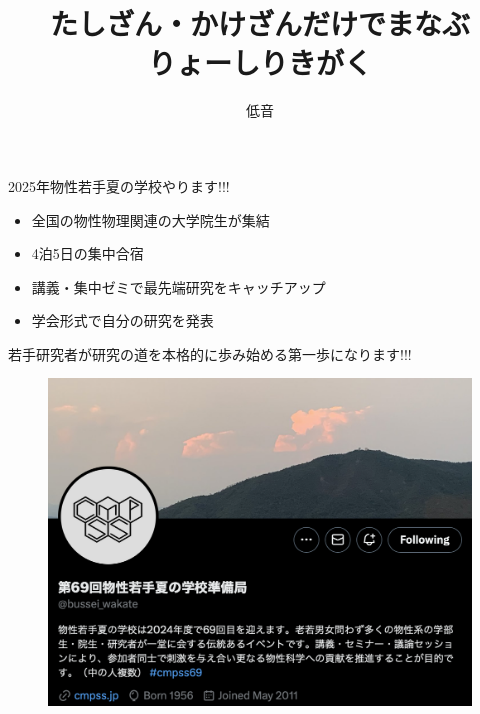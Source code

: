 \documentclass[dvipdfm]{beamer}
\title{たしざん・かけざんだけでまなぶ\\りょーしりきがく}
\author{低音}
\begin{document}
\begin{frame}
    \titlepage
\end{frame}

\begin{frame}{2025年物性若手夏の学校やります!!!}
    \begin{itemize}
        \item 全国の物性物理関連の大学院生が集結
        \item 4泊5日の集中合宿
        \item 講義・集中ゼミで最先端研究をキャッチアップ
        \item 学会形式で自分の研究を発表
    \end{itemize}
    若手研究者が研究の道を本格的に歩み始める第一歩になります!!!

    \textbf{}

    \begin{figure}
        \centering
        \includegraphics[width=0.6\linewidth]{bussei-tweet.png}
    \end{figure}
\end{frame}
\end{document}
